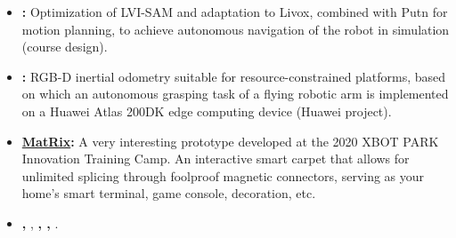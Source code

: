 \begin{itemize}

\item \textbf{:} Optimization of LVI-SAM and adaptation to Livox, combined with Putn for motion planning, to achieve autonomous navigation of the robot in simulation (course design). \\

\vspace{-8pt}

\item \textbf{:}
RGB-D inertial odometry suitable for resource-constrained platforms, based on which an autonomous grasping task of a flying robotic arm is implemented on a Huawei Atlas 200DK edge computing device (Huawei project). \\

\vspace{-8pt}

\item \textbf{\href{https://www.bilibili.com/video/BV1gb4y127by?share_source=copy_web}{MatRix}:} A very interesting prototype developed at the 2020 XBOT PARK Innovation Training Camp. An interactive smart carpet that allows for unlimited splicing through foolproof magnetic connectors, serving as your home's smart terminal, game console, decoration, etc. \\ 
\vspace{-8pt} 
\item \textbf{, }, \textbf{, , 
}. 
\end{itemize}